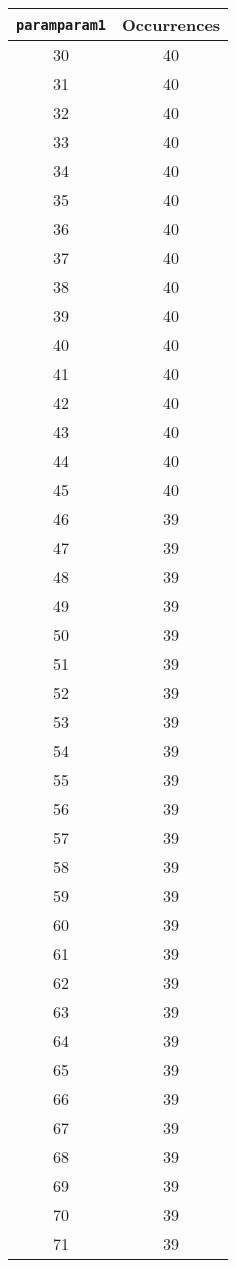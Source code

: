 \documentclass[letterpaper, 12pt]{article}
\begin{document}
\begin{longtable}{|c|c|}
\hline
\textbf{\texttt{paramparam1}} & \textbf{Occurrences} \\
\hline
30 & 40 \\
\hline
31 & 40 \\
\hline
32 & 40 \\
\hline
33 & 40 \\
\hline
34 & 40 \\
\hline
35 & 40 \\
\hline
36 & 40 \\
\hline
37 & 40 \\
\hline
38 & 40 \\
\hline
39 & 40 \\
\hline
40 & 40 \\
\hline
41 & 40 \\
\hline
42 & 40 \\
\hline
43 & 40 \\
\hline
44 & 40 \\
\hline
45 & 40 \\
\hline
46 & 39 \\
\hline
47 & 39 \\
\hline
48 & 39 \\
\hline
49 & 39 \\
\hline
50 & 39 \\
\hline
51 & 39 \\
\hline
52 & 39 \\
\hline
53 & 39 \\
\hline
54 & 39 \\
\hline
55 & 39 \\
\hline
56 & 39 \\
\hline
57 & 39 \\
\hline
58 & 39 \\
\hline
59 & 39 \\
\hline
60 & 39 \\
\hline
61 & 39 \\
\hline
62 & 39 \\
\hline
63 & 39 \\
\hline
64 & 39 \\
\hline
65 & 39 \\
\hline
66 & 39 \\
\hline
67 & 39 \\
\hline
68 & 39 \\
\hline
69 & 39 \\
\hline
70 & 39 \\
\hline
71 & 39 \\

\end{longtable}
\end{document}
